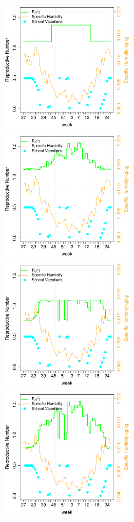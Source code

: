 \documentclass[a4paper]{article}
\begin{document}
\begin{figure}[htpb]
  \centering
  \includegraphics[width=2.7in]{figures/RoftModel5.pdf}
  \hspace{.1in}
  \includegraphics[width=2.7in]{figures/RoftModel3.pdf}
  \\[.1in]
  \includegraphics[width=2.7in]{figures/RoftModel2.pdf}
  \hspace{.1in}
  \includegraphics[width=2.7in]{figures/RoftModel1.pdf}

\end{figure}
\end{document}
